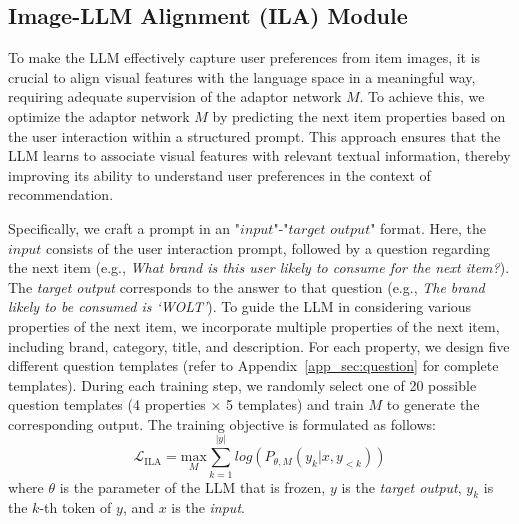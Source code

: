 \documentclass[sigconf]{acmart}
\begin{document}
\subsection{Image-LLM Alignment (ILA) Module}
\label{sec:alignment}
To make the LLM effectively capture user preferences from item images, it is crucial to align visual features with the language space in a meaningful way, requiring adequate supervision of the adaptor network $M$. 
To achieve this, we optimize the adaptor network $M$ by predicting the next item properties based on the user interaction within a structured prompt. This approach ensures that the LLM learns to associate visual features with relevant textual information, thereby improving its ability to understand user preferences in the context of recommendation.


Specifically, we craft a prompt in an $\textit{"input"}$-$\textit{"target output"}$ format. Here, the $\textit{input}$ consists of the user interaction prompt, followed by a question regarding the next item (e.g., \textit{What brand is this user likely to consume for the next item?}). The \textit{target output} corresponds to the answer to that question (e.g., \textit{The brand likely to be consumed is `WOLT'}). To guide the LLM in considering various properties of the next item, we incorporate multiple properties of the next item, including brand, category, title, and description. For each property, we design five different question templates (refer to Appendix~\ref{app_sec:question} for complete templates). During each training step, we randomly select one of 20 possible question templates (4 properties × 5 templates) and train $M$ to generate the corresponding output. The training objective is formulated as follows:
\begin{equation}
    \mathcal{L}_{\text{ILA}}=\underset{M}{\textrm{max}}\sum_{k=1}^{|y|}log(P_{\theta,M}(y_k|x,y_{<k}))
    \label{eqn:ila}
\end{equation}
where $\theta$ is the parameter of the LLM that is frozen, $y$ is the \textit{target output}, $y_k$ is the $k$-th token of $y$, and $x$ is the \textit{input}.
\end{document}

